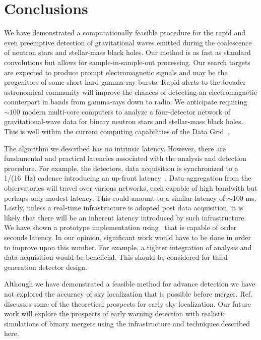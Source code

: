 \section{Conclusions}
\label{SECV}\label{sec:conclusions}

We have demonstrated a computationally feasible procedure for the rapid and even preemptive
detection of gravitational waves emitted during the coalescence of neutron
stars and stellar-mass black holes. Our method is as fast as standard \fft{}
convolutions but allows for sample-in-sample-out processing.
Our search targets are expected to
produce prompt electromagnetic signals and may be the progenitors of some short
hard gamma-ray bursts.  Rapid alerts to the broader astronomical community will
improve the chances of detecting an electromagnetic counterpart in bands from
gamma-rays down to radio.  We anticipate requiring $\sim100$ modern
multi-core computers to analyze a four-detector network of gravitational-wave data
for binary neutron stars and stellar-mass black holes.  This is well within the
current computing capabilities of the \LIGO{} Data Grid~\cite{LDG}.

The algorithm we described has no intrinsic latency.  However, there are
fundamental and practical latencies associated with the analysis and detection
procedure. For example, the \LIGO{} detectors, data acquisition is synchronized
to a 1/(16~Hz) cadence introducing an up-front latency~\cite{CITE_CDS}.  Data aggregation from
the observatories will travel over various networks, each capable of high
bandwith but perhaps only modest latency.  This could amount to a similar
latency of $\sim$100 ms.  Lastly, unless a real-time infrastructure is adopted
post data acquisition, it is likely that there will be an inherent latency
introduced by such infrastructure.  We have shown a prototype implementation
using \gstlal\ that is capable of order seconds latency. In our opinion,
significant work would have to be done in order to improve upon this number.
For example, a tighter integration of analysis and data acquisition would be
beneficial. This should be considered for third-generation detector design.

Although we have demonstrated a feasible method for advance detection we have
not explored the accuracy of sky localization that is possible before merger.
Ref.~\cite{Fairhurst2009} discusses some of the theoretical prospects for early sky
localization.  Our future work will explore the prospects of early warning
detection with realistic simulations of binary mergers using the infrastructure
and techniques described here. 

